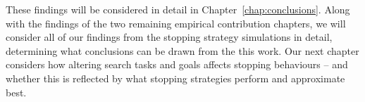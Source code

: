 These findings will be considered in detail in Chapter~\ref{chap:conclusions}. Along with the findings of the two remaining empirical contribution chapters, we will consider all of our findings from the stopping strategy simulations in detail, determining what conclusions can be drawn from the this work. Our next chapter considers how altering search tasks and goals affects stopping behaviours -- and whether this is reflected by what stopping strategies perform and approximate best.

\newpage
\thispagestyle{empty}
\mbox{}